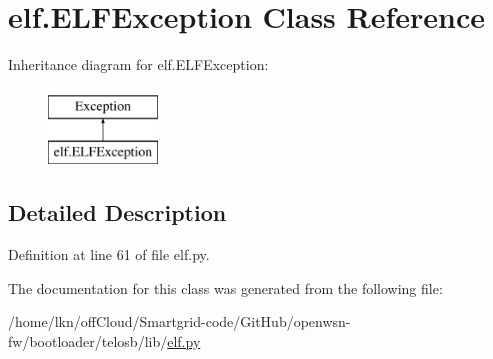 \hypertarget{clasself_1_1_e_l_f_exception}{}\section{elf.\+E\+L\+F\+Exception Class Reference}
\label{clasself_1_1_e_l_f_exception}
Inheritance diagram for elf.\+E\+L\+F\+Exception\+:\begin{figure}[H]
\begin{center}
\leavevmode
\includegraphics[height=2.000000cm]{clasself_1_1_e_l_f_exception}
\end{center}
\end{figure}


\subsection{Detailed Description}


Definition at line 61 of file elf.\+py.



The documentation for this class was generated from the following file\+:\begin{DoxyCompactItemize}
\item 
/home/lkn/off\+Cloud/\+Smartgrid-\/code/\+Git\+Hub/openwsn-\/fw/bootloader/telosb/lib/\hyperlink{elf_8py}{elf.\+py}\end{DoxyCompactItemize}
